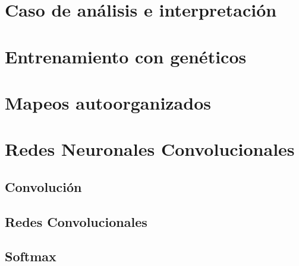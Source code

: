 \documentclass[12pt,openany]{book}
\begin{document}
\chapter{Caso de análisis e interpretación}



\chapter{Entrenamiento con genéticos}






\chapter{Mapeos autoorganizados}





\chapter{Redes Neuronales Convolucionales}
\section{Convolución}
\section{Redes Convolucionales}
\section{Softmax}
\end{document}
